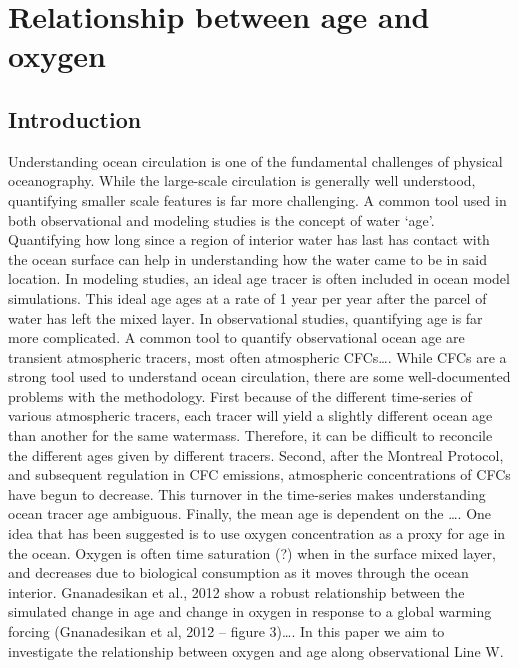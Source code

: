 \graphicspath{{figures/oxygen/}}

\chapter{Relationship between age and oxygen}
\label{cha:oxygen}


\section{Introduction}
Understanding ocean circulation is one of the fundamental challenges of physical oceanography. While the large-scale circulation is generally well understood, quantifying smaller scale features is far more challenging. A common tool used in both observational and modeling studies is the concept of water ‘age’. Quantifying how long since a region of interior water has last has contact with the ocean surface can help in understanding how the water came to be in said location. In modeling studies, an ideal age tracer is often included in ocean model simulations. This ideal age ages at a rate of 1 year per year after the parcel of water has left the mixed layer. In observational studies, quantifying age is far more complicated. A common tool to quantify observational ocean age are transient atmospheric tracers, most often atmospheric CFCs….
	While CFCs are a strong tool used to understand ocean circulation, there are some well-documented problems with the methodology. First because of the different time-series of various atmospheric tracers, each tracer will yield a slightly different ocean age than another for the same watermass. Therefore, it can be difficult to reconcile the different ages given by different tracers. Second, after the Montreal Protocol, and subsequent regulation in CFC emissions, atmospheric concentrations of CFCs have begun to decrease. This turnover in the time-series makes understanding ocean tracer age ambiguous. Finally, the mean age is dependent on the ….
	One idea that has been suggested is to use oxygen concentration as a proxy for age in the ocean. Oxygen is often time saturation (?) when in the surface mixed layer, and decreases due to biological consumption as it moves through the ocean interior. Gnanadesikan et al., 2012 show a robust relationship between the simulated change in age and change in oxygen in response to a global warming forcing (Gnanadesikan et al, 2012 – figure 3)….
	In this paper we aim to investigate the relationship between oxygen and age along observational Line W.






